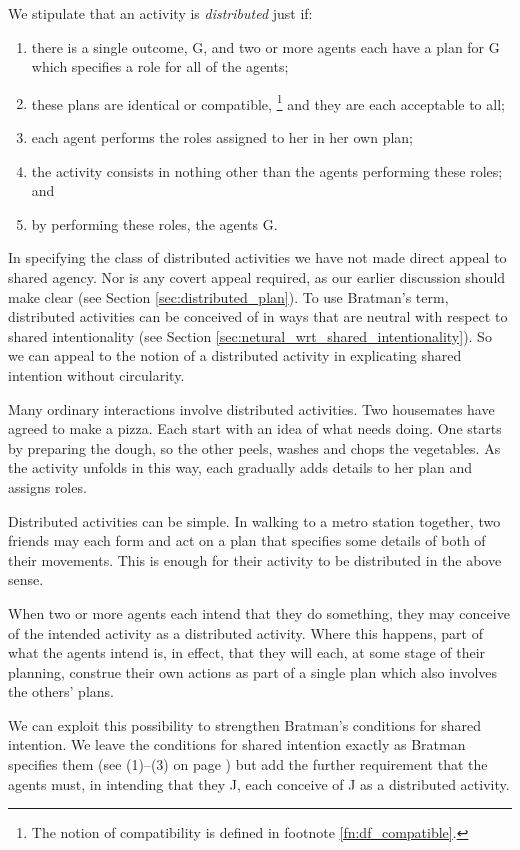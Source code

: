 \documentclass[12pt,\papersize]{extarticle}
\begin{document}
We stipulate that an activity is \emph{distributed} just if: 
\begin{enumerate}[label=\emph{\alph*})]
\item 	there is a single outcome, G,
	and two or more agents each have a plan for G which specifies a role for all of the agents;	
\item 	these plans are identical or compatible,%
\footnote{
The notion of compatibility is defined in footnote \vref{fn:df_compatible}.
}
%
		and they are each acceptable to all; 
\item	each agent performs the roles assigned to her in her own plan;
\item	the activity consists in nothing other than the agents performing these roles;
	and
\item	by performing these roles, the agents G.

\end{enumerate}
%
In specifying the class of distributed activities we have not made direct appeal to shared agency. 
Nor is any covert appeal required, as our earlier discussion should  make clear (see Section \vref{sec:distributed_plan}).
To use Bratman's term, distributed activities can be conceived of in ways that are neutral with respect to shared intentionality (see Section \vref{sec:netural_wrt_shared_intentionality}).
So we can appeal  to the notion of a distributed activity in explicating shared intention without circularity.

Many ordinary interactions involve distributed activities.
Two housemates have agreed to make a pizza. 
Each start with an idea of what needs doing.
One starts by preparing the dough, so the other peels, washes and chops the vegetables.
As the activity unfolds in this way, each gradually adds details to her plan and assigns roles. 

Distributed activities can be simple.
In walking to a metro station together,
two friends may each form and act on a plan that specifies some details of both of their movements.
This is enough for their activity to be distributed in the above sense.

When two or more agents each intend that they do something, 
they may conceive of the intended activity as a distributed activity.
Where this happens, part of what the agents intend is, in effect, that they will each, at some stage of their planning, construe their own actions as part of a single plan which also involves the others' plans.

We can exploit this possibility %
to strengthen Bratman's conditions for shared intention.
We leave the conditions for shared intention exactly as Bratman specifies them (see (1)--(3) on page \pageref{quote:bratman_account})
but add the further requirement that the agents must, in intending that they J, each conceive of J as a distributed activity.
\end{document}
